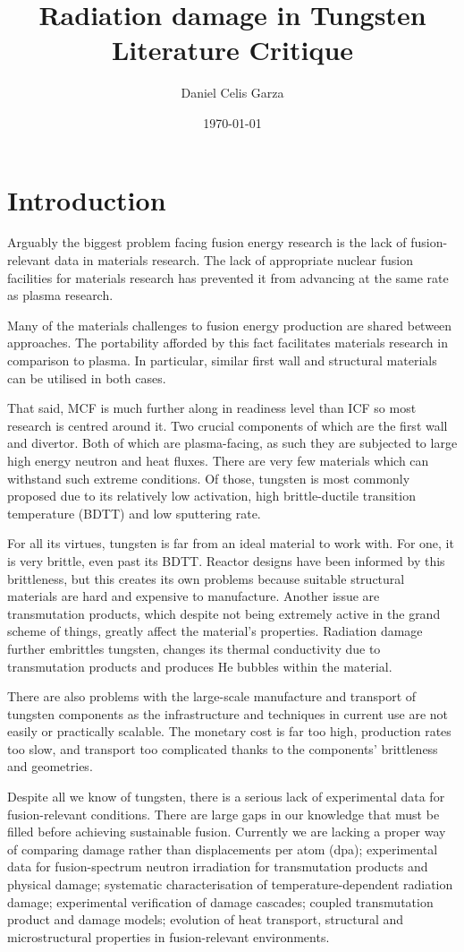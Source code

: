 \documentclass[12pt, a4paper]{article}
\title{Radiation damage in Tungsten Literature Critique}
\author{Daniel Celis Garza}
\date{\today}
\newcommand{\ic}{ICF}
\newcommand{\mc}{MCF}
\newcommand{\bd}{BDTT}
\newcommand{\da}{dpa}
\newcommand{\fs}{fusion}
\newcommand{\rl}{relevant}
\newcommand{\en}{energy}
\newcommand{\pr}{production}
\newcommand{\tn}{tungsten}
\newcommand{\n}{neutron}
\newcommand{\ir}{irradiation}
\newcommand{\tr}{transmutation}
\begin{document}
	\maketitle
	\section{Introduction}\label{s:intro}
		Arguably the biggest problem facing \fs{} \en{} research is the lack of \fs{}-\rl{} data in materials research. The lack of appropriate nuclear fusion facilities for materials research has prevented it from advancing at the same rate as plasma research.
		
		Many of the materials challenges to \fs{} \en{} \pr{} are shared between approaches. The portability afforded by this fact facilitates materials research in comparison to plasma. In particular, similar first wall and structural materials can be utilised in both cases.
		
		That said, \mc{} is much further along in readiness level than \ic{} so most research is centred around it. Two crucial components of which are the first wall and divertor. Both of which are plasma-facing, as such they are subjected to large high \en{} \n{} and heat fluxes. There are very few materials which can withstand such extreme conditions. Of those, \tn{} is most commonly proposed due to its relatively low activation, high brittle-ductile transition temperature (\bd{}) and low sputtering rate.
		
		For all its virtues, \tn{} is far from an ideal material to work with. For one, it is very brittle, even past its \bd{}. Reactor designs have been informed by this brittleness, but this creates its own problems because suitable structural materials are hard and expensive to manufacture. Another issue are \tr{} products, which despite not being extremely active in the grand scheme of things, greatly affect the material's properties. Radiation damage further embrittles \tn{}, changes its thermal conductivity due to \tr{} products and produces He bubbles within the material. 
		
		There are also problems with the large-scale manufacture and transport of \tn{} components as the infrastructure and techniques in current use are not easily or practically scalable. The monetary cost is far too high, \pr{} rates too slow, and transport too complicated thanks to the components' brittleness and geometries.
		
		Despite all we know of \tn{}, there is a serious lack of experimental data for \fs{}-\rl{} conditions. There are large gaps in our knowledge that must be filled before achieving sustainable \fs{}. Currently we are lacking a proper way of comparing damage rather than displacements per atom (\da{}); experimental data for \fs{}-spectrum \n{} \ir{} for \tr{} products and physical damage; systematic characterisation of temperature-dependent radiation damage; experimental verification of damage cascades; coupled \tr{} product and damage models; evolution of heat transport, structural and microstructural properties in \fs{}-\rl{} environments.
		
\end{document}
